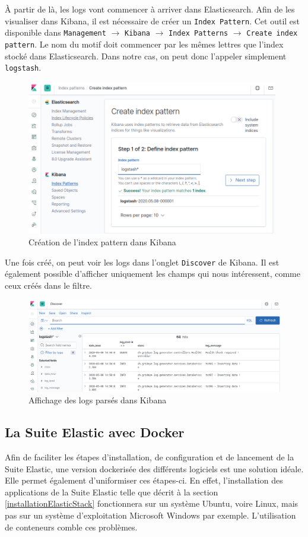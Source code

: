 \documentclass[paper=a4, fontsize=11pt]{scrartcl}
\begin{document}
À partir de là, les logs vont commencer à arriver dans Elasticsearch. Afin de les visualiser dans Kibana, il est nécessaire de créer un \verb,Index Pattern,. Cet outil est disponible dans \verb,Management, $\rightarrow$ \verb,Kibana, $\rightarrow$ \verb,Index Patterns, $\rightarrow$ \verb,Create index pattern,. Le nom du motif doit commencer par les mêmes lettres que l'index stocké dans Elasticsearch. Dans notre cas, on peut donc l'appeler simplement \verb,logstash,.
\begin{figure}[H]
    \centering
    \includegraphics[width=11cm]{img/screenshots/kib_create_index_pattern.png}
    \caption{Création de l'index pattern dans Kibana}
    \label{f-kibCreateIndexPattern}
\end{figure}
Une fois créé, on peut voir les logs dans l'onglet \verb,Discover, de Kibana. Il est également possible d'afficher uniquement les champs qui nous intéressent, comme ceux créés dans le filtre.
\begin{figure}[H]
    \centering
    \includegraphics[width=18cm]{img/screenshots/kib_logs_arrived.png}
    \caption{Affichage des logs parsés dans Kibana}
    \label{f-kibLogsArrived}
\end{figure}

\subsection{La Suite Elastic avec Docker}
Afin de faciliter les étapes d'installation, de configuration et de lancement de la Suite Elastic, une version \og dockerisée \fg des différents logiciels est une solution idéale. Elle permet également d'uniformiser ces étapes-ci. En effet, l'installation des applications de la Suite Elastic telle que décrit à la section \ref{installationElasticStack} fonctionnera sur un système Ubuntu, voire Linux, mais pas sur un système d'exploitation Microsoft Windows par exemple. L'utilisation de conteneurs comble ces problèmes.
\end{document}

